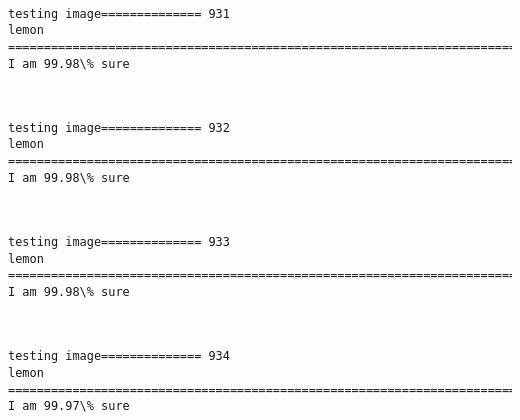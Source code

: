 \documentclass[11pt]{article}
\begin{document}
    \begin{center}
    \end{center}
    { \hspace*{\fill} \\}
    
    \begin{Verbatim}[commandchars=\\\{\}]
testing image============== 931
lemon
============================================================================
I am 99.98\% sure

    \end{Verbatim}

    \begin{center}
    \end{center}
    { \hspace*{\fill} \\}
    
    \begin{Verbatim}[commandchars=\\\{\}]
testing image============== 932
lemon
============================================================================
I am 99.98\% sure

    \end{Verbatim}

    \begin{center}
    \end{center}
    { \hspace*{\fill} \\}
    
    \begin{Verbatim}[commandchars=\\\{\}]
testing image============== 933
lemon
============================================================================
I am 99.98\% sure

    \end{Verbatim}

    \begin{center}
    \end{center}
    { \hspace*{\fill} \\}
    
    \begin{Verbatim}[commandchars=\\\{\}]
testing image============== 934
lemon
============================================================================
I am 99.97\% sure

    \end{Verbatim}
\end{document}
